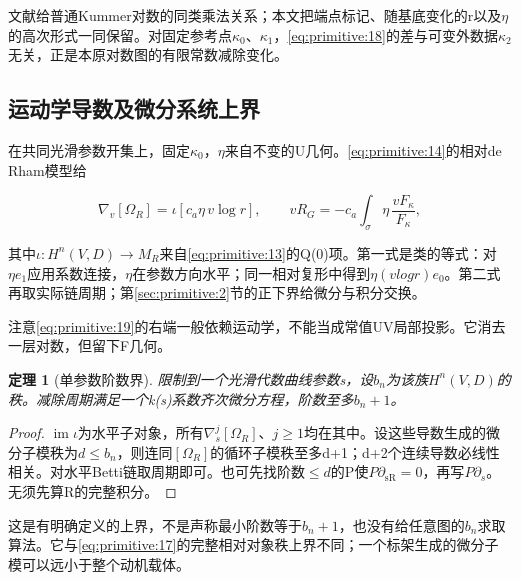 \documentclass[11pt,a4paper,oneside]{ctexart}
\theoremstyle{cnplain}
\newtheorem{theorem}{定理}[section]
\theoremstyle{definition}
\theoremstyle{remark}
\numberwithin{equation}{section}
\begin{document}
文献\cite{brownperiods}给普通Kummer对数的同类乘法关系；本文把端点标记、随基底变化的r以及\(\eta \)的高次形式一同保留。对固定参考点\(\kappa _0\)、\(\kappa _1\)，\eqref{eq:primitive:18}的差与可变外数据\(\kappa _2\)无关，正是本原对数图的有限常数减除变化。


\subsection{运动学导数及微分系统上界}\label{sec:primitive:7}

在共同光滑参数开集上，固定\(\kappa _0\)，\(\eta \)来自不变的U几何。\eqref{eq:primitive:14}的相对de Rham模型给

\begin{equation}
\nabla_v[\Omega_R]=\iota\!\left[c_a\eta\,v\log r\right],\qquad
 vR_G=-c_a\int_\sigma\eta\,\frac{vF_\kappa}{F_\kappa},          \label{eq:primitive:19}
\end{equation}

其中\(\iota:H^n(V,D)\to M_R\)来自\eqref{eq:primitive:13}的Q(0)项。第一式是类的等式：对\(\eta e_1\)应用系数连接，\(\eta \)在参数方向水平；同一相对复形中得到\(\eta (vlog r)e_0\)。第二式再取实际链周期；第\ref{sec:primitive:2}节的正下界给微分与积分交换。

注意\eqref{eq:primitive:19}的右端一般依赖运动学，不能当成常值UV局部投影。它消去一层对数，但留下F几何。

\begin{theorem}[单参数阶数界]

\label{thm:primitive:7.1} 限制到一个光滑代数曲线参数s，设\(b_n\)为该族\(H^n(V,D)\)的秩。减除周期满足一个k(s)系数齐次微分方程，阶数至多\(b_n+1\)。

\end{theorem}

\begin{proof}

\(\operatorname{im}\iota\)为水平子对象，所有\(\nabla _s^j[\Omega _R]\)、\(j\ge 1\)均在其中。设这些导数生成的微分子模秩为\(d\le b_n\)，则连同\([\Omega _R]\)的循环子模秩至多d+1；d+2个连续导数必线性相关。对水平Betti链取周期即可。也可先找阶数\(\le d\)的P使\(P\partial _{\mathrm{sR}}=0\)，再写\(P\partial _s\)。无须先算R的完整积分。

\end{proof}

这是有明确定义的上界，不是声称最小阶数等于\(b_n+1\)，也没有给任意图的\(b_n\)求取算法。它与\eqref{eq:primitive:17}的完整相对对象秩上界不同；一个标架生成的微分子模可以远小于整个动机载体。
\end{document}
